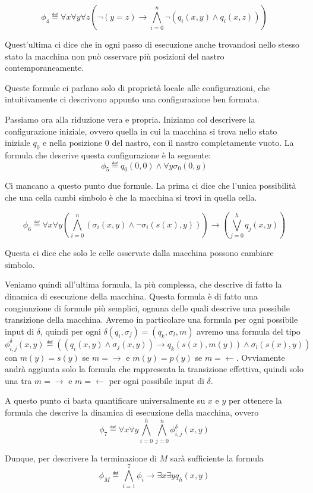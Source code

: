 \[\phi_4 \eqdef \forall x \forall y \forall z (\neg(y = z)\to \bigwedge_{i=0}^{n} \neg(q_i(x,y) \land q_i(x,z)))\]

Quest'ultima ci dice che in ogni passo di esecuzione anche trovandosi nello stesso stato la macchina non può osservare più posizioni del nastro contemporaneamente.

Queste formule ci parlano solo di proprietà locale alle configurazioni, che intuitivamente ci descrivono appunto una configurazione ben formata.

Passiamo ora alla riduzione vera e propria. Iniziamo col descrivere la configurazione iniziale, ovvero quella in cui la macchina si trova nello stato iniziale \(q_0\) e nella posizione \(0\) del nastro, con il nastro completamente vuoto. La formula che descrive questa configurazione è la seguente:
\[\phi_5 \eqdef q_0(0,0) \land \forall y \sigma_0(0,y) \]

Ci mancano a questo punto due formule. La prima ci dice che l'unica possibilità che una cella cambi simbolo è che la macchina si trovi in quella cella.

\[\phi_6 \eqdef \forall x \forall y (\bigwedge_{i=0}^{n} (\sigma_i(x,y) \land \neg \sigma_i(s(x),y))) \to (\bigvee_{j=0}^{h} q_j(x,y))\]

Questa ci dice che solo le celle osservate dalla macchina possono cambiare simbolo.

Veniamo quindi all'ultima formula, la più complessa, che descrive di fatto la dinamica di esecuzione della macchina. Questa formula è di fatto una congiunzione di formule più semplici, ognuna delle quali descrive una possibile transizione della macchina. Avremo in particolare una formula per ogni possibile input di \(\delta\), quindi per ogni \(\delta(q_i,\sigma_j) = (q_k, \sigma_l, m)\) avremo una formula del tipo
\[\phi^{\delta}_{i,j} (x,y)\eqdef ((q_i(x,y) \land \sigma_j(x,y)) \to q_k(s(x),m(y)) \land \sigma_l(s(x),y))\]
con \(m(y) = s(y)\) se \(m = \rightarrow\) e \(m(y) = p(y)\) se \(m = \leftarrow\). Ovviamente andrà aggiunta solo la formula che rappresenta la transizione effettiva, quindi solo una tra \(m = \rightarrow\) e \(m = \leftarrow\) per ogni possibile input di \(\delta\).

A questo punto ci basta quantificare universalmente su \(x\) e \(y\) per ottenere la formula che descrive la dinamica di esecuzione della macchina, ovvero
\[\phi_7 \eqdef \forall x \forall y \bigwedge_{i=0}^{h} \bigwedge_{j=0}^{n} \phi^{\delta}_{i,j}(x,y)\]

Dunque, per descrivere la terminazione di \(M\) sarà sufficiente la formula
\[\phi_M \eqdef \bigwedge_{i=1}^7 \phi_i \to \exists x \exists y q_h(x,y)\]

